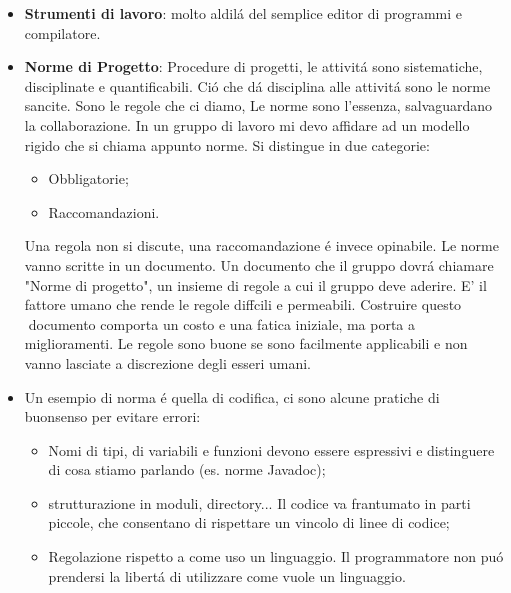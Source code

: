 \documentclass[a4paper,10pt] {article}
\begin{document}
\begin{itemize}
	\begin{itemize}
	\item Locking: procedura che assicura un invariante, che su un singolo CI 
	lavori in ogni istante al pi\'u una persona.
	\end{itemize}

	\item \textbf{Strumenti di lavoro}: molto aldil\'a del semplice editor di 
	programmi e compilatore.
	
	\item \textbf{Norme di Progetto}: Procedure di progetti, le attivit\'a sono 
	sistematiche, disciplinate e 
	quantificabili. Ci\'o che d\'a disciplina
	alle attivit\'a sono le norme sancite. Sono le regole che ci diamo,
	Le norme sono l'essenza, salvaguardano la collaborazione. In un gruppo di 
	lavoro mi devo affidare ad un
	modello rigido che si chiama appunto norme. Si distingue in due categorie:
	\begin{itemize}	
		\item Obbligatorie;
		\item Raccomandazioni.
\end{itemize}
	Una regola non si discute, una raccomandazione \'e invece opinabile. Le 
	norme vanno scritte in un documento.
	Un documento che il gruppo dovr\'a chiamare  "Norme di progetto", un 
	insieme di regole a cui il gruppo deve aderire. E' il fattore umano che 
	rende le regole diffcili e permeabili. 
	Costruire questo documento comporta un
	costo e una fatica iniziale, ma porta a miglioramenti. Le regole sono 
	buone se sono facilmente applicabili
	e non vanno lasciate a discrezione degli esseri umani.
	
	
	\item Un esempio di norma \'e quella di codifica,
	 ci sono alcune pratiche di buonsenso per evitare errori:
	\begin{itemize}
		\item Nomi di tipi, di variabili e funzioni devono essere espressivi e 
		distinguere di cosa stiamo parlando (es.
		norme Javadoc);
		\item  strutturazione in moduli, directory... Il codice va
		frantumato in parti piccole, che consentano di rispettare un vincolo di 
		linee di codice;
		\item Regolazione rispetto a come uso un linguaggio. Il programmatore 
		non pu\'o prendersi la libert\'a di utilizzare come vuole un linguaggio.
	\end{itemize}

\end{itemize}
\end{document}
